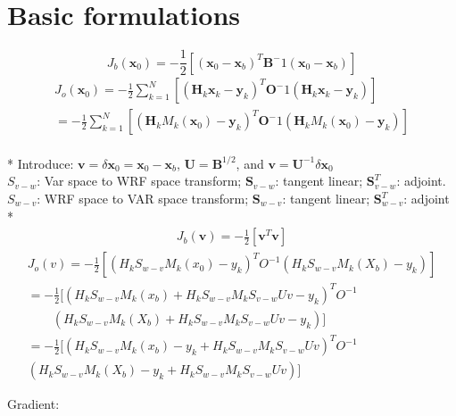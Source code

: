 \documentclass[a4paper,12pt,titlepage]{article}
\begin{document}
\section{Basic formulations}
\begin{equation}
J_b(\mathbf{x}_0)=-\frac{1}{2}[(\mathbf{x}_0-\mathbf{x}_b)^T\mathbf{B}^-1(\mathbf{x}_0-\mathbf{x}_b)]
\end{equation}
\begin{align}
J_o(\mathbf{x}_0)=-\frac{1}{2}\sum_{k=1}^N[(\mathbf{H}_k\mathbf{x}_k-\mathbf{y}_k)^T\mathbf{O}^-1(\mathbf{H}_k\mathbf{x}_k-\mathbf{y}_k)] \nonumber \\
 =-\frac{1}{2}\sum_{k=1}^N[(\mathbf{H}_kM_k(\mathbf{x}_0)-\mathbf{y}_k)^T\mathbf{O}^-1(\mathbf{H}_kM_k(\mathbf{x}_0)-\mathbf{y}_k)]
\end{align}
\\*
Introduce: $\mathbf{v}=\delta\mathbf{x}_0=\mathbf{x}_0-\mathbf{x}_b$, $\mathbf{U}=\mathbf{B}^{1/2}$, and $\mathbf{v}=\mathbf{U}^{-1}\delta\mathbf{x}_0$\\
$S_{v-w}$: Var space to WRF space transform; $\mathbf{S}_{v-w}$: tangent linear; $\mathbf{S}^T_{v-w}$: adjoint.\\
$S_{w-v}$: WRF space to VAR space transform; $\mathbf{S}_{w-v}$: tangent linear; $\mathbf{S}^T_{w-v}$: adjoint
\\*
\begin{align}
J_b(\mathbf{v})=-\frac{1}{2}[\mathbf{v}^T\mathbf{v}]
\end{align}
\begin{align}
J_o(v)=-\frac{1}{2}[(H_kS_{w-v}M_k(x_0)-y_k)^TO^{-1}(H_kS_{w-v}M_k(X_b)-y_k)] \nonumber \\
=-\frac{1}{2}[(H_kS_{w-v}M_k(x_b)+H_kS_{w-v}M_kS_{v-w}Uv-y_k)^TO^{-1} \nonumber \\
  \qquad (H_kS_{w-v}M_k(X_b)+H_kS_{w-v}M_kS_{v-w}Uv-y_k)] \nonumber \\
  =-\frac{1}{2}[(H_kS_{w-v}M_k(x_b)-y_k+H_kS_{w-v}M_kS_{v-w}Uv)^TO^{-1} \nonumber \\
  (H_kS_{w-v}M_k(X_b)-y_k+H_kS_{w-v}M_kS_{v-w}Uv)]
\end{align}


Gradient:
\end{document}
